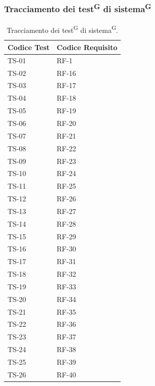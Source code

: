 \documentclass[8pt]{article}
\newcommand{\glossterm}[1]{#1\textsuperscript{G}} %
\begin{document}
\subsubsection{Tracciamento dei \glossterm{test} di \glossterm{sistema}}\label{sec:tracciamento test sistema}
\renewcommand{\arraystretch}{2.5}
\begin{longtable}{|>{\centering}p{4cm}|>{\centering\arraybackslash}p{4cm}|}
\hline
\rowcolor{white}
\textbf{Codice Test} & \textbf{Codice Requisito} \\
\hline
\endfirsthead
\rowcolor{white}
\caption{Tracciamento dei \glossterm{test} di \glossterm{sistema}.}
\label{table:Tracciamento dei test di sistema}
\endlastfoot
    TS-01 & RF-1 \\
    \hline
    TS-02 & RF-16 \\
    \hline 
    TS-03 & RF-17 \\
    \hline
    TS-04 & RF-18 \\
    \hline
    TS-05 & RF-19 \\
    \hline
    TS-06 & RF-20 \\
    \hline
    TS-07 & RF-21 \\
    \hline
    TS-08 & RF-22 \\
    \hline
    TS-09 & RF-23 \\
    \hline
    TS-10 & RF-24 \\
    \hline
    TS-11 & RF-25 \\
    \hline
    TS-12 & RF-26 \\
    \hline
    TS-13 & RF-27 \\
    \hline
    TS-14 & RF-28 \\
    \hline
    TS-15 & RF-29 \\
    \hline
    TS-16 & RF-30 \\
    \hline
    TS-17 & RF-31 \\
    \hline
    TS-18 & RF-32 \\
    \hline
    TS-19 & RF-33 \\
    \hline
    TS-20 & RF-34 \\
    \hline
    TS-21 & RF-35 \\
    \hline
    TS-22 & RF-36 \\
    \hline
    TS-23 & RF-37 \\
    \hline
    TS-24 & RF-38 \\
    \hline
    TS-25 & RF-39 \\
    \hline
    TS-26 & RF-40 \\
    \hline

\end{longtable}
\end{document}
